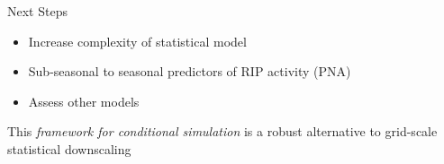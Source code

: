 \begin{block}{Next Steps}
  \begin{itemize}
    \item Increase complexity of statistical model
    \item Sub-seasonal to seasonal predictors of RIP activity (\ie PNA)
    \item Assess other models
  \end{itemize}
  This \emph{framework for conditional simulation} is a robust alternative to grid-scale statistical downscaling
\end{block}
